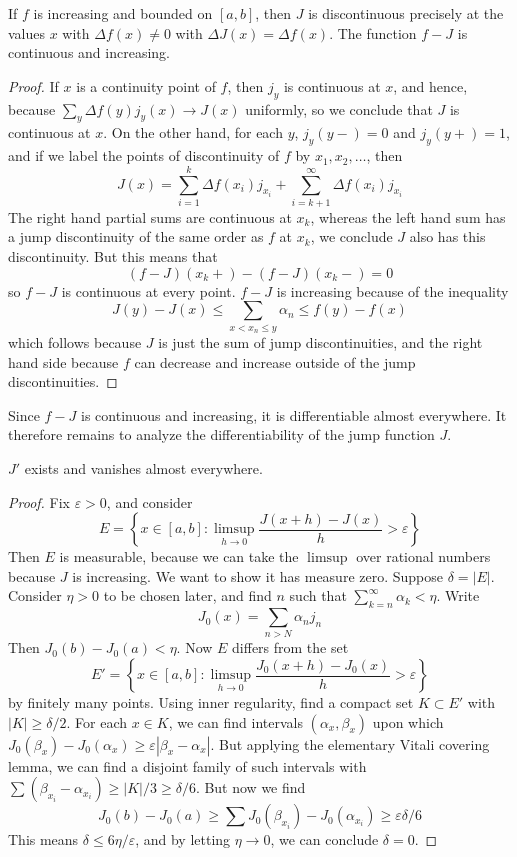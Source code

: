 \begin{lemma}
    If $f$ is increasing and bounded on $[a,b]$, then $J$ is discontinuous precisely at the values $x$ with $\Delta f(x) \neq 0$ with $\Delta J(x) = \Delta f(x)$. The function $f - J$ is continuous and increasing.
\end{lemma}
\begin{proof}
    If $x$ is a continuity point of $f$, then $j_y$ is continuous at $x$, and hence, because $\sum_y \Delta f(y) j_y(x) \to J(x)$ uniformly, so we conclude that $J$ is continuous at $x$. On the other hand, for each $y$, $j_y(y-) = 0$ and $j_y(y+) = 1$, and if we label the points of discontinuity of $f$ by $x_1, x_2, \dots$, then
    \[ J(x) = \sum_{i = 1}^k \Delta f(x_i) j_{x_i} + \sum_{i = k+1}^\infty \Delta f(x_i) j_{x_i} \]
    The right hand partial sums are continuous at $x_k$, whereas the left hand sum has a jump discontinuity of the same order as $f$ at $x_k$, we conclude $J$ also has this discontinuity. But this means that
    \[ (f - J)(x_k+) - (f - J)(x_k-) = 0 \]
    so $f - J$ is continuous at every point. $f - J$ is increasing because of the inequality
    \[ J(y) - J(x) \leq \sum_{x < x_n \leq y} \alpha_n \leq f(y) - f(x) \]
    which follows because $J$ is just the sum of jump discontinuities, and the right hand side because $f$ can decrease and increase outside of the jump discontinuities.
\end{proof}

Since $f - J$ is continuous and increasing, it is differentiable almost everywhere. It therefore remains to analyze the differentiability of the jump function $J$.

\begin{theorem}
    $J'$ exists and vanishes almost everywhere.
\end{theorem}
\begin{proof}
    Fix $\varepsilon > 0$, and consider
    \[ E = \left\{ x \in [a,b]: \limsup_{h \to 0} \frac{J(x + h) - J(x)}{h} > \varepsilon \right\} \]
    Then $E$ is measurable, because we can take the $\limsup$ over rational numbers because $J$ is increasing. We want to show it has measure zero. Suppose $\delta = |E|$. Consider $\eta > 0$ to be chosen later, and find $n$ such that $\sum_{k = n}^\infty \alpha_k < \eta$. Write
    \[ J_0(x) = \sum_{n > N} \alpha_n j_n \]
    Then $J_0(b) - J_0(a) < \eta$. Now $E$ differs from the set
    \[ E' = \left\{ x \in [a,b]: \limsup_{h \to 0} \frac{J_0(x + h) - J_0(x)}{h} > \varepsilon \right\} \]
    by finitely many points. Using inner regularity, find a compact set $K \subset E'$ with $|K| \geq \delta/2$. For each $x \in K$, we can find intervals $(\alpha_x, \beta_x)$ upon which $J_0(\beta_x) - J_0(\alpha_x) \geq \varepsilon |\beta_x - \alpha_x|$. But applying the elementary Vitali covering lemma, we can find a disjoint family of such intervals with $\sum (\beta_{x_i} - \alpha_{x_i}) \geq |K|/3 \geq \delta/6$. But now we find
    \[ J_0(b) - J_0(a) \geq \sum J_0(\beta_{x_i}) - J_0(\alpha_{x_i}) \geq \varepsilon \delta/6 \]
    This means $\delta \leq 6 \eta/\varepsilon$, and by letting $\eta \to 0$, we can conclude $\delta = 0$.
\end{proof}

